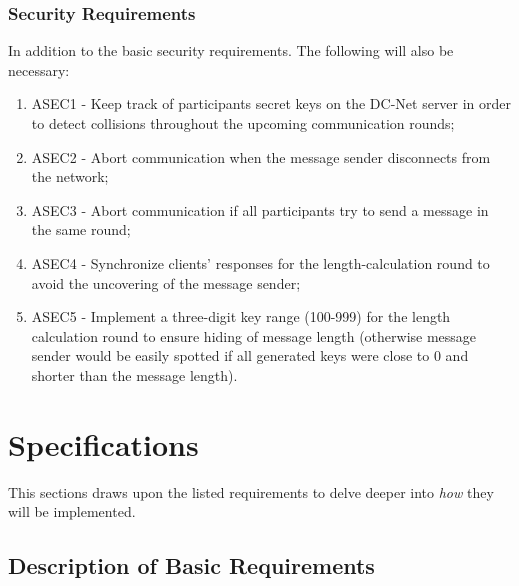 \subsubsection{Security Requirements}
In addition to the basic security requirements. The following will also be necessary:
\begin{enumerate}
    \item ASEC1 - Keep track of participants secret keys on the DC-Net server in order to detect collisions throughout the upcoming communication rounds;
    \item ASEC2 - Abort communication when the message sender disconnects from the network;
    \item ASEC3 - Abort communication if all participants try to send a message in the same round;
    \item ASEC4 - Synchronize clients' responses for the length-calculation round to avoid the uncovering of the message sender;
    \item ASEC5 - Implement a three-digit key range (100-999) for the length calculation round to ensure hiding of message length (otherwise message sender would be easily spotted if all generated keys were close to 0 and shorter than the message length).
\end{enumerate}


\section{Specifications}
This sections draws upon the listed requirements to delve deeper into \emph{how} they will be implemented.


\subsection{Description of Basic Requirements}

